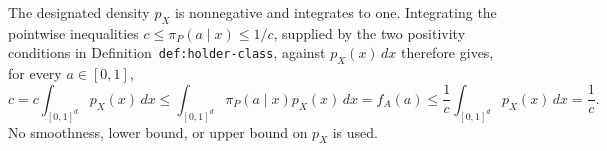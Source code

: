 The designated density \(p_X\) is nonnegative and integrates to one. Integrating the pointwise inequalities \(c\le\pi_P(a\mid x)\le1/c\), supplied by the two positivity conditions in Definition~\texttt{def:holder-class}, against \(p_X(x)\,dx\) therefore gives, for every \(a\in[0,1]\),
\[
c=c\int_{[0,1]^d}p_X(x)\,dx
\le \int_{[0,1]^d}\pi_P(a\mid x)p_X(x)\,dx
=f_A(a)
\le \frac1c\int_{[0,1]^d}p_X(x)\,dx
=\frac1c.
\]
No smoothness, lower bound, or upper bound on \(p_X\) is used.
